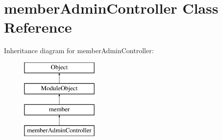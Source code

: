 \hypertarget{classmemberAdminController}{\section{member\-Admin\-Controller Class Reference}
\label{classmemberAdminController}
}
Inheritance diagram for member\-Admin\-Controller\-:\begin{figure}[H]
\begin{center}
\leavevmode
\includegraphics[height=4.000000cm]{classmemberAdminController}
\end{center}
\end{figure}
